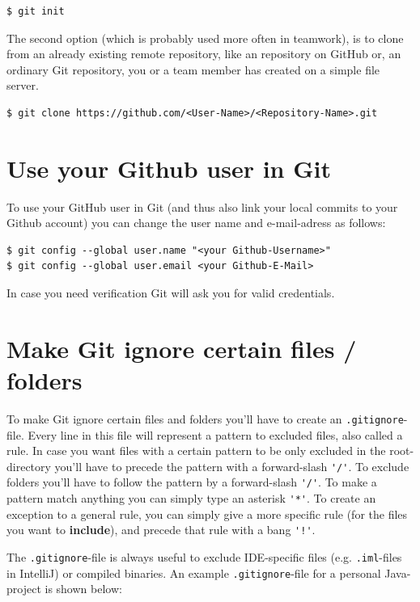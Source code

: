 \documentclass[a4paper, 12pt]{article}
\begin{document}
		\begin{lstlisting}
$ git init
		\end{lstlisting}
		
		The second option (which is probably used more often in teamwork), is to clone from an already existing remote repository, like an repository on GitHub or, an ordinary Git repository, you or a team member has created on a simple file server.

		\begin{lstlisting}
$ git clone https://github.com/<User-Name>/<Repository-Name>.git
		\end{lstlisting}
		
	\section{Use your Github user in Git}
	
		To use your GitHub user in Git (and thus also link your local commits to your Github account) you can change the user name and e-mail-adress as follows:
		
		\begin{lstlisting}
$ git config --global user.name "<your Github-Username>"
$ git config --global user.email <your Github-E-Mail>
		\end{lstlisting}
		
		In case you need verification Git will ask you for valid credentials.
		\newpage
				
	\section{Make Git ignore certain files / folders}
		
		To make Git ignore certain files and folders you'll have to create an \lstinline|.gitignore|-file. Every line in this file will represent a pattern to excluded files, also called a rule. In case you want files with a certain pattern to be only excluded in the root-directory you'll have to precede the pattern with a forward-slash \lstinline|'/'|. To exclude folders you'll have to follow the pattern by a forward-slash \lstinline|'/'|. To make a pattern match anything you can simply type an asterisk \lstinline|'*'|. To create an exception to a general rule, you can simply give a more specific rule (for the files you want to \textbf{include}), and precede that rule with a bang \lstinline|'!'|.
		
		The \lstinline|.gitignore|-file is always useful to exclude IDE-specific files (e.g. \lstinline|.iml|-files in IntelliJ) or compiled binaries. An example \lstinline|.gitignore|-file for a personal Java-project is shown below:
		
\end{document}
